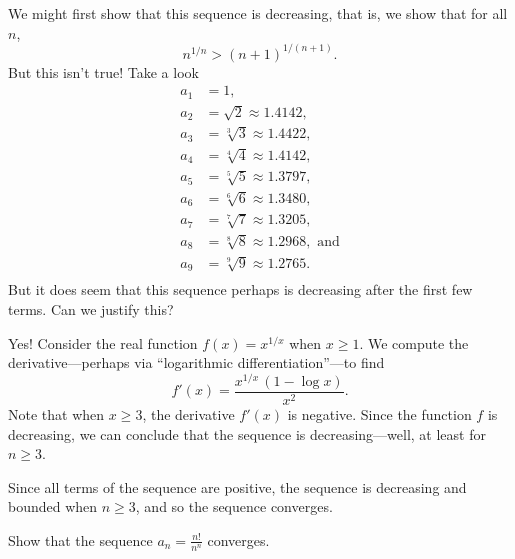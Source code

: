 \documentclass{ximera}
\newcommand{\ds}{\displaystyle}
\begin{document}
\begin{solution}
  We might first show that this sequence is decreasing, that is, we show
  that for all $n$,
  $$
  n^{1/n} > (n+1)^{1/(n+1)}.
  $$
  But this isn't true!  Take a look
  \begin{align*}
    a_1 &= 1, \\
    a_2 &= \sqrt{2} \approx 1.4142, \\
    a_3 &= \sqrt[3]{3} \approx 1.4422, \\
    a_4 &= \sqrt[4]{4} \approx 1.4142, \\
    a_5 &= \sqrt[5]{5} \approx 1.3797, \\
    a_6 &= \sqrt[6]{6} \approx 1.3480, \\
    a_7 &= \sqrt[7]{7} \approx 1.3205, \\
    a_8 &= \sqrt[8]{8} \approx 1.2968, \mbox{ and}\\
    a_9 &= \sqrt[9]{9} \approx 1.2765. \\
  \end{align*}
  But it does seem that this sequence perhaps is decreasing after the
  first few terms.  Can we justify this?

  Yes!  Consider the real function $\ds f(x)=x^{1/x}$ when $x\ge1$.
  We compute the derivative---perhaps via ``logarithmic differentiation''---to find
  $$
  f'(x)=\frac{x^{1/x} \, (1-\log x)}{x^2}.
  $$
  Note that when $x\ge 3$, the derivative $f'(x)$ is negative.  Since the function $f$ is decreasing, we can conclude that the sequence is decreasing---well, at least for $n \geq 3$.

  Since all terms of the sequence are positive, the sequence is
  decreasing and bounded when $n \ge 3$, and so the sequence converges.
\end{solution}


\begin{example}
Show that the sequence $a_n = \ds\frac{n!}{n^n}$ converges.
\end{example}
\end{document}

